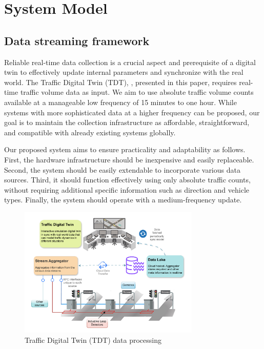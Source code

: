 \section{System Model}\label{sec:system-model}
\subsection{\textbf{Data streaming framework}}

Reliable real-time data collection is a crucial aspect and prerequisite of a digital twin to effectively update internal parameters and synchronize with the real world. The Traffic Digital Twin (TDT), \name, presented in this paper, requires real-time traffic volume data as input. We aim to use absolute traffic volume counts available at a manageable low frequency of 15 minutes to one hour. While systems with more sophisticated data at a higher frequency can be proposed, our goal is to maintain the collection infrastructure as affordable, straightforward, and compatible with already existing systems globally. 

Our proposed system aims to ensure practicality and adaptability as follows. First, the hardware infrastructure should be inexpensive and easily replaceable. Second, the system should be easily extendable to incorporate various data sources. Third, it should function effectively using only absolute traffic counts, without requiring additional specific information such as direction and vehicle types. Finally, the system should operate with a medium-frequency update.

\begin{figure}[t]
  \centering
  \includegraphics[width=0.77\textwidth]{framework.pdf} %
  \caption{Traffic Digital Twin (TDT) data processing}
  \label{fig:framework}
\end{figure}

